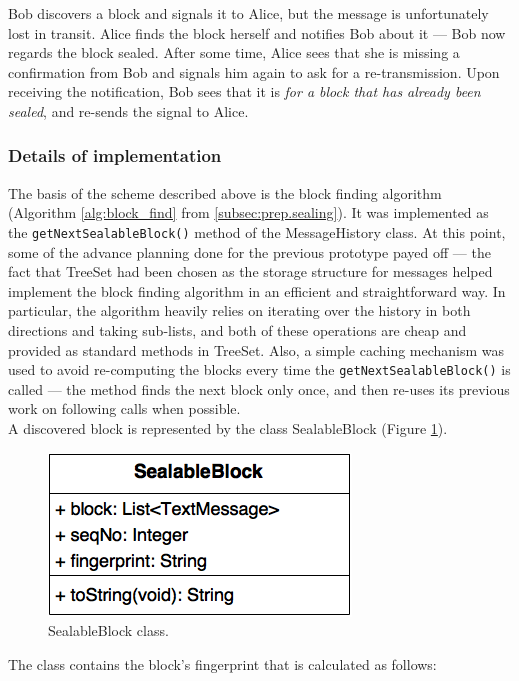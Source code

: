\documentclass[a4paper, twoside, 12pt]{report}
\begin{document}
Bob discovers a block and signals it to Alice, but the message is unfortunately lost in transit. Alice finds the block herself and notifies Bob about it --- Bob now regards the block sealed. After some time, Alice sees that she is missing a confirmation from Bob and signals him again to ask for a re-transmission. Upon receiving the notification, Bob sees that it is \emph{for a block that has already been sealed}, and re-sends the signal to Alice. 


\subsubsection{Details of implementation}
The basis of the scheme described above is the block finding algorithm (Algorithm \ref{alg:block_find} from \cref{subsec:prep.sealing}). It was implemented as the \texttt{getNextSealableBlock()} method of the MessageHistory class. At this point, some of the advance planning done for the previous prototype payed off --- the fact that TreeSet had been chosen as the storage structure for messages helped implement the block finding algorithm in an efficient and straightforward way. In particular, the algorithm heavily relies on iterating over the history in both directions and taking sub-lists, and both of these operations are cheap and provided as standard methods in TreeSet. Also, a simple caching mechanism was used to avoid re-computing the blocks every time the \texttt{getNextSealableBlock()} is called --- the method finds the next block only once, and then re-uses its previous work on following calls when possible.\\

A discovered block is represented by the class SealableBlock (Figure \ref{fig:sealable_block_uml}).

\begin{figure}[H]
    \captionsetup{width=0.80\textwidth}
    \centering
    \includegraphics[width=0.4\linewidth]{pics/sealable_block_uml.png}
    \caption{\label{fig:sealable_block_uml} SealableBlock class.}
\end{figure}

The class contains the block's fingerprint that is calculated as follows:
\end{document}
